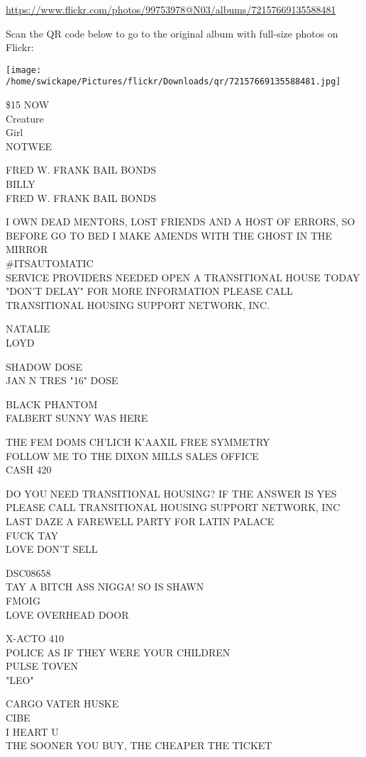 \documentclass[10pt,letterpaper]{article}
\begin{document}
\url{https://www.flickr.com/photos/99753978@N03/albums/72157669135588481}

Scan the QR code below to go to the original album with full-size photos on Flickr:

\texttt{[image: /home/swickape/Pictures/flickr/Downloads/qr/72157669135588481.jpg]}
\pagebreak

\$15 NOW\\
Creature\\
Girl\\
NOTWEE

FRED W. FRANK BAIL BONDS\\
BILLY\\
FRED W. FRANK BAIL BONDS

I OWN DEAD MENTORS, LOST FRIENDS AND A HOST OF ERRORS, SO BEFORE GO TO BED I MAKE AMENDS WITH THE GHOST IN THE MIRROR\\
\#ITSAUTOMATIC\\
SERVICE PROVIDERS NEEDED OPEN A TRANSITIONAL HOUSE TODAY "DON'T DELAY" FOR MORE INFORMATION PLEASE CALL TRANSITIONAL HOUSING SUPPORT NETWORK, INC.

NATALIE\\
LOYD

SHADOW DOSE\\
JAN N TRES "16" DOSE

BLACK PHANTOM\\
FALBERT SUNNY WAS HERE

THE FEM DOMS CH'LICH K'AAXIL FREE SYMMETRY\\
FOLLOW ME TO THE DIXON MILLS SALES OFFICE\\
CASH 420

DO YOU NEED TRANSITIONAL HOUSING?  IF THE ANSWER IS YES PLEASE CALL TRANSITIONAL HOUSING SUPPORT NETWORK, INC\\
LAST DAZE A FAREWELL PARTY FOR LATIN PALACE\\
FUCK TAY\\
LOVE DON'T SELL

DSC08658\\
TAY A BITCH ASS NIGGA!  SO IS SHAWN\\
FMOIG\\
LOVE OVERHEAD DOOR

X{-}ACTO 410\\
POLICE AS IF THEY WERE YOUR CHILDREN\\
PULSE TOVEN\\
"LEO"

CARGO VATER HUSKE\\
CIBE\\
I HEART U\\
THE SOONER YOU BUY, THE CHEAPER THE TICKET
\end{document}

